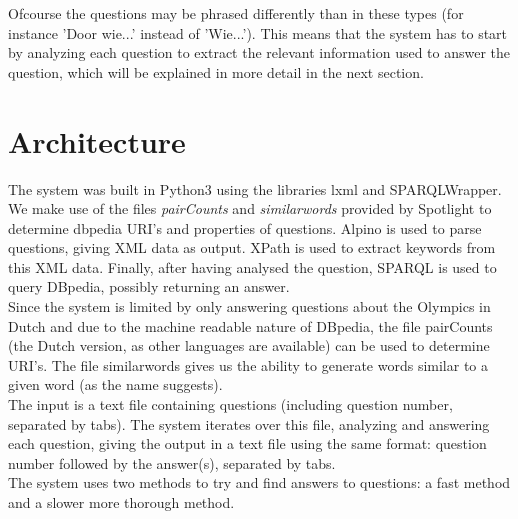 \documentclass[a4paper,11pt]{article}
\begin{document}
Ofcourse the questions may be phrased differently than in these types (for instance 'Door wie...' instead of 'Wie...'). This means that the system has to start by analyzing each question to extract the relevant information used to answer the question, which will be explained in more detail in the next section.




\section{Architecture}
The system was built in Python3 using the libraries lxml and SPARQLWrapper. We make use of the files \emph{pairCounts} and \emph{similarwords} provided by Spotlight \citep{isem2013daiber} to determine dbpedia URI's and properties of questions. Alpino is used to parse questions, giving XML data as output. XPath is used to extract keywords from this XML data. Finally, after having analysed the question, SPARQL is used to query DBpedia, possibly returning an answer.\vspace{2mm}\\
Since the system is limited by only answering questions about the Olympics in Dutch and due to the machine readable nature of DBpedia, the file pairCounts (the Dutch version, as other languages are available) can be used to determine URI's. The file similarwords gives us the ability to generate words similar to a given word (as the name suggests).\vspace{2mm}\\
The input is a text file containing questions (including question number, separated by tabs). The system iterates over this file, analyzing and answering each question, giving the output in a text file using the same format: question number followed by the answer(s), separated by tabs.\vspace{2mm}\\
The system uses two methods to try and find answers to questions: a fast method and a slower more thorough method.
\end{document}
